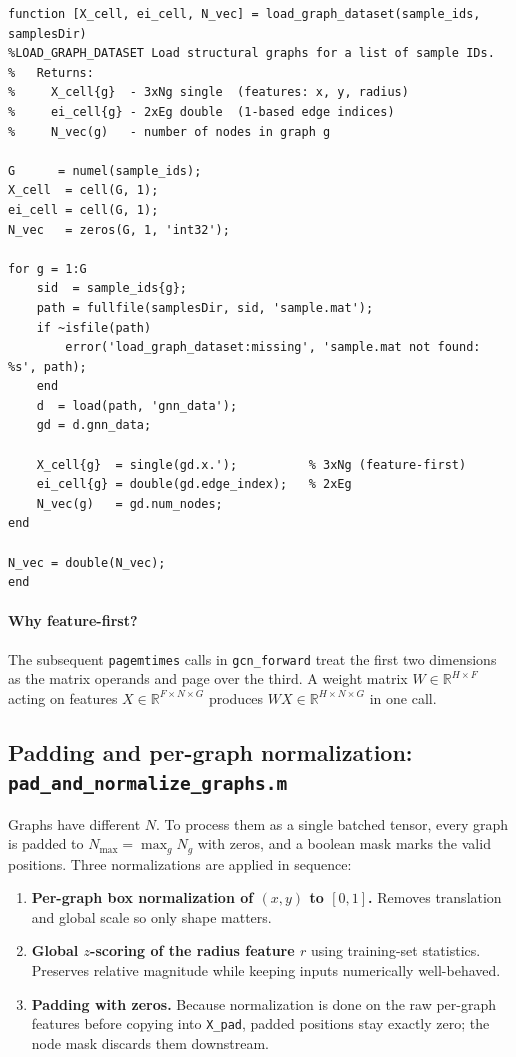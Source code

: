 \documentclass[11pt]{article}
\begin{document}
\begin{lstlisting}[caption={\texttt{helpers/load\_graph\_dataset.m}}]
function [X_cell, ei_cell, N_vec] = load_graph_dataset(sample_ids, samplesDir)
%LOAD_GRAPH_DATASET Load structural graphs for a list of sample IDs.
%   Returns:
%     X_cell{g}  - 3xNg single  (features: x, y, radius)
%     ei_cell{g} - 2xEg double  (1-based edge indices)
%     N_vec(g)   - number of nodes in graph g

G      = numel(sample_ids);
X_cell  = cell(G, 1);
ei_cell = cell(G, 1);
N_vec   = zeros(G, 1, 'int32');

for g = 1:G
    sid  = sample_ids{g};
    path = fullfile(samplesDir, sid, 'sample.mat');
    if ~isfile(path)
        error('load_graph_dataset:missing', 'sample.mat not found: %s', path);
    end
    d  = load(path, 'gnn_data');
    gd = d.gnn_data;

    X_cell{g}  = single(gd.x.');          % 3xNg (feature-first)
    ei_cell{g} = double(gd.edge_index);   % 2xEg
    N_vec(g)   = gd.num_nodes;
end

N_vec = double(N_vec);
end
\end{lstlisting}

\paragraph{Why feature-first?} The subsequent \texttt{pagemtimes} calls in
\texttt{gcn\_forward} treat the first two dimensions as the matrix operands
and page over the third. A weight matrix $W\in\mathbb{R}^{H\times F}$ acting
on features $X\in\mathbb{R}^{F\times N\times G}$ produces
$WX\in\mathbb{R}^{H\times N\times G}$ in one call.

\subsection{Padding and per-graph normalization:\\
            \texttt{pad\_and\_normalize\_graphs.m}}

Graphs have different $N$. To process them as a single batched tensor, every
graph is padded to $N_{\max}=\max_g N_g$ with zeros, and a boolean mask marks
the valid positions. Three normalizations are applied in sequence:

\begin{enumerate}[label=(\roman*)]
  \item \textbf{Per-graph box normalization of $(x,y)$ to $[0,1]$.}
        Removes translation and global scale so only shape matters.
  \item \textbf{Global $z$-scoring of the radius feature $r$} using
        training-set statistics. Preserves relative magnitude while keeping
        inputs numerically well-behaved.
  \item \textbf{Padding with zeros.} Because normalization is done on the raw
        per-graph features before copying into \texttt{X\_pad}, padded
        positions stay exactly zero; the node mask discards them downstream.
\end{enumerate}
\end{document}
